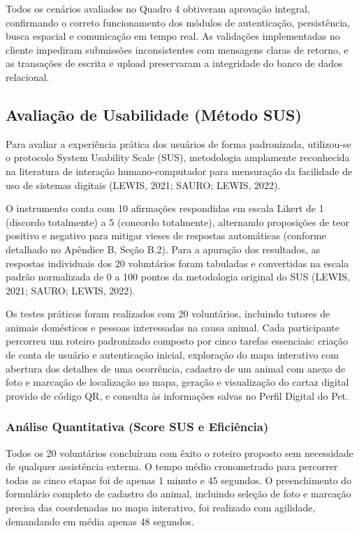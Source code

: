 Todos os cenários avaliados no Quadro 4 obtiveram aprovação integral, confirmando o correto funcionamento dos módulos de autenticação, persistência, busca espacial e comunicação em tempo real. As validações implementadas no cliente impediram submissões inconsistentes com mensagens claras de retorno, e as transações de escrita e upload preservaram a integridade do banco de dados relacional.

\subsection{Avaliação de Usabilidade (Método SUS)}

Para avaliar a experiência prática dos usuários de forma padronizada, utilizou-se o protocolo System Usability Scale (SUS), metodologia amplamente reconhecida na literatura de interação humano-computador para mensuração da facilidade de uso de sistemas digitais (LEWIS, 2021; SAURO; LEWIS, 2022).

O instrumento conta com 10 afirmações respondidas em escala Likert de 1 (discordo totalmente) a 5 (concordo totalmente), alternando proposições de teor positivo e negativo para mitigar vieses de respostas automáticas (conforme detalhado no Apêndice B, Seção B.2). Para a apuração dos resultados, as respostas individuais dos 20 voluntários foram tabuladas e convertidas na escala padrão normalizada de 0 a 100 pontos da metodologia original do SUS (LEWIS, 2021; SAURO; LEWIS, 2022).

Os testes práticos foram realizados com 20 voluntários, incluindo tutores de animais domésticos e pessoas interessadas na causa animal. Cada participante percorreu um roteiro padronizado composto por cinco tarefas essenciais: criação de conta de usuário e autenticação inicial, exploração do mapa interativo com abertura dos detalhes de uma ocorrência, cadastro de um animal com anexo de foto e marcação de localização no mapa, geração e visualização do cartaz digital provido de código QR, e consulta às informações salvas no Perfil Digital do Pet.

\subsubsection{Análise Quantitativa (Score SUS e Eficiência)}

Todos os 20 voluntários concluíram com êxito o roteiro proposto sem necessidade de qualquer assistência externa. O tempo médio cronometrado para percorrer todas as cinco etapas foi de apenas 1 minuto e 45 segundos. O preenchimento do formulário completo de cadastro do animal, incluindo seleção de foto e marcação precisa das coordenadas no mapa interativo, foi realizado com agilidade, demandando em média apenas 48 segundos.

